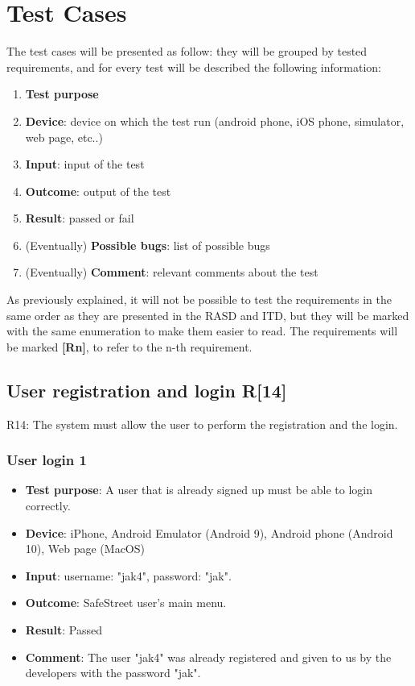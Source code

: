 \documentclass[../ATD.tex]{subfiles}
\begin{document}
    \section{Test Cases}\label{sec:test-cases}
    The test cases will be presented as follow: they will be grouped by tested requirements, and for every test will be described the following information:
    \begin{enumerate}
        \item \textbf{Test purpose}
        \item \textbf{Device}: device on which the test run (android phone, iOS phone, simulator, web page, etc..)
        \item \textbf{Input}: input of the test
        \item \textbf{Outcome}: output of the test
        \item \textbf{Result}: passed or fail
        \item (Eventually) \textbf{Possible bugs}: list of possible bugs
        \item (Eventually) \textbf{Comment}: relevant comments about the test
    \end{enumerate}
    As previously explained, it will not be possible to test the requirements in the same order as they are presented in the RASD and ITD,
    but they will be marked with the same enumeration to make them easier to read.
    The requirements will be marked \textbf{[Rn]}, to refer to the n-th requirement.

    \subsection{User registration and login R[14]}\label{subsec:user-registration-and-login}
    R14: The system must allow the user to perform the registration and the login.

    \subsubsection{User login 1}\label{subsubsec:user-login-1}
    \begin{itemize}
        \item \textbf{Test purpose}: A user that is already signed up must be able to login correctly.
        \item \textbf{Device}: iPhone, Android Emulator (Android 9), Android phone (Android 10), Web page (MacOS)
        \item \textbf{Input}: username: "jak4", password: "jak".
        \item \textbf{Outcome}: SafeStreet user's main menu.
        \item \textbf{Result}: Passed
        \item \textbf{Comment}: The user "jak4" was already registered and given to us by the developers with the password "jak".
    \end{itemize}
\end{document}

